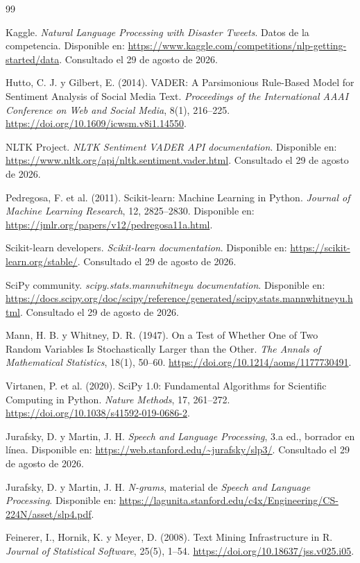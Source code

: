 \documentclass[11pt,letterpaper]{article}
\begin{document}
\clearpage
\begin{thebibliography}{99}

Kaggle. \emph{Natural Language Processing with Disaster Tweets}. Datos de la competencia. Disponible en: \url{https://www.kaggle.com/competitions/nlp-getting-started/data}. Consultado el 29 de agosto de 2026.

Hutto, C. J. y Gilbert, E. (2014). VADER: A Parsimonious Rule-Based Model for Sentiment Analysis of Social Media Text. \emph{Proceedings of the International AAAI Conference on Web and Social Media}, 8(1), 216--225. \url{https://doi.org/10.1609/icwsm.v8i1.14550}.

NLTK Project. \emph{NLTK Sentiment VADER API documentation}. Disponible en: \url{https://www.nltk.org/api/nltk.sentiment.vader.html}. Consultado el 29 de agosto de 2026.

Pedregosa, F. et al. (2011). Scikit-learn: Machine Learning in Python. \emph{Journal of Machine Learning Research}, 12, 2825--2830. Disponible en: \url{https://jmlr.org/papers/v12/pedregosa11a.html}.

Scikit-learn developers. \emph{Scikit-learn documentation}. Disponible en: \url{https://scikit-learn.org/stable/}. Consultado el 29 de agosto de 2026.

SciPy community. \emph{scipy.stats.mannwhitneyu documentation}. Disponible en: \url{https://docs.scipy.org/doc/scipy/reference/generated/scipy.stats.mannwhitneyu.html}. Consultado el 29 de agosto de 2026.

Mann, H. B. y Whitney, D. R. (1947). On a Test of Whether One of Two Random Variables Is Stochastically Larger than the Other. \emph{The Annals of Mathematical Statistics}, 18(1), 50--60. \url{https://doi.org/10.1214/aoms/1177730491}.

Virtanen, P. et al. (2020). SciPy 1.0: Fundamental Algorithms for Scientific Computing in Python. \emph{Nature Methods}, 17, 261--272. \url{https://doi.org/10.1038/s41592-019-0686-2}.

Jurafsky, D. y Martin, J. H. \emph{Speech and Language Processing}, 3.a ed., borrador en línea. Disponible en: \url{https://web.stanford.edu/~jurafsky/slp3/}. Consultado el 29 de agosto de 2026.

Jurafsky, D. y Martin, J. H. \emph{N-grams}, material de \emph{Speech and Language Processing}. Disponible en: \url{https://lagunita.stanford.edu/c4x/Engineering/CS-224N/asset/slp4.pdf}.

Feinerer, I., Hornik, K. y Meyer, D. (2008). Text Mining Infrastructure in R. \emph{Journal of Statistical Software}, 25(5), 1--54. \url{https://doi.org/10.18637/jss.v025.i05}.

\end{thebibliography}
\end{document}
